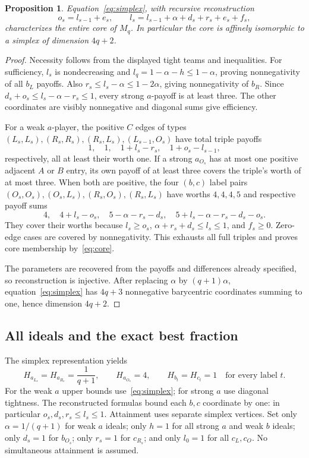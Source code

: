 \documentclass[11pt]{article}
\newtheorem{proposition}[theorem]{Proposition}
\theoremstyle{remark}\newtheorem{remark}[theorem]{Remark}
\begin{document}
\begin{proposition}\label{prop:simplex}
Equation~\eqref{eq:simplex}, with recursive reconstruction
\[
 o_s=l_{s-1}+e_s,\qquad
 l_s=l_{s-1}+\alpha+d_s+r_s+e_s+f_s,
\]
characterizes the entire core of $M_q$. In particular the core is affinely
isomorphic to a simplex of dimension $4q+2$.
\end{proposition}
\begin{proof}
Necessity follows from the displayed tight teams and inequalities.
For sufficiency, $l_s$ is nondecreasing and
$l_q=1-\alpha-h\le1-\alpha$, proving nonnegativity of all $b_L$ payoffs.
Also $r_s\le l_s-\alpha\le1-2\alpha$, giving nonnegativity of $b_R$.
Since $d_s+o_s\le l_s-\alpha-r_s\le1$, every strong $a$-payoff is at least
three. The other coordinates are visibly nonnegative and diagonal sums give
efficiency.

For a weak $a$-player, the positive $C$ edges of types
$(L_s,L_s),(R_s,R_s),(R_s,L_s),(L_{s-1},O_s)$ have total triple payoffs
\[
 1,\quad1,\quad1+l_s-r_s,\quad1+o_s-l_{s-1},
\]
respectively, all at least their worth one. If a strong $a_{O_s}$ has at
most one positive adjacent $A$ or $B$ entry, its own payoff of at least
three covers the triple's worth of at most three. When both are positive,
the four $(b,c)$ label pairs $(O_s,O_s),(O_s,L_s),(R_s,O_s),(R_s,L_s)$
have worths $4,4,4,5$ and respective payoff sums
\[
 4,\quad4+l_s-o_s,\quad5-\alpha-r_s-d_s,
 \quad5+l_s-\alpha-r_s-d_s-o_s.
\]
They cover their worths because $l_s\ge o_s$,
$\alpha+r_s+d_s\le l_s\le1$, and $f_s\ge0$. Zero-edge cases are
covered by nonnegativity. This exhausts all full triples and proves core
membership by~\eqref{eq:core}.

The parameters are recovered from the payoffs and differences already
specified, so reconstruction is injective. After replacing $\alpha$ by
$(q+1)\alpha$, equation~\eqref{eq:simplex} has $4q+3$ nonnegative
barycentric coordinates summing to one, hence dimension $4q+2$.
\end{proof}

\subsection{All ideals and the exact best fraction}
The simplex representation yields
\begin{equation}\label{eq:ideals}
 H_{a_{L_s}}=H_{a_{R_s}}=\frac1{q+1},\qquad H_{a_{O_s}}=4,
 \qquad H_{b_t}=H_{c_t}=1\quad\text{for every label }t.
\end{equation}
For the weak $a$ upper bounds use~\eqref{eq:simplex}; for strong $a$ use
diagonal tightness. The reconstructed formulas bound each $b,c$ coordinate
by one: in particular $o_s,d_s,r_s\le l_s\le1$.
Attainment uses separate simplex vertices. Set only $\alpha=1/(q+1)$ for
weak $a$ ideals; only $h=1$ for all strong $a$ and weak $b$ ideals;
only $d_s=1$ for $b_{O_s}$; only $r_s=1$ for $c_{R_s}$; and only $l_0=1$
for all $c_L,c_O$. No simultaneous attainment is assumed.
\end{document}
